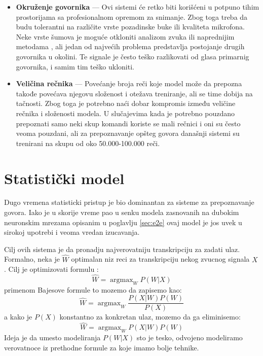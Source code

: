 \documentclass[a4paper]{article}
\DeclareMathOperator*{\argmax}{argmax}
\begin{document}
\begin{itemize}
  \item \textbf{Okruženje govornika} --- 
  Ovi sistemi će retko biti korišćeni u potpuno tihim prostorijama sa profesionalnom opremom za snimanje. Zbog toga treba da budu tolerantni na različite vrste pozadinske buke ili kvaliteta mikrofona. 
  Neke vrste šumova je moguće otkloniti analizom zvuka ili naprednijim metodama \cite{xu2015enhancement}, ali jedan od najvećih problema predstavlja postojanje drugih govornika u okolini.
  Te signale je često teško razlikovati od glasa primarnig govornika, i samim tim teško ukloniti.
  
  \item \textbf{Veličina rečnika} --- 
  Povećanje broja reči koje model može da prepozna takođe povećava njegovu složenost i otežava treniranje, ali se time dobija na tačnosti. 
  Zbog toga je potrebno naći dobar kompromis između veličine rečnika i složenosti modela. 
  U slučajevima kada je potrebno pouzdano prepoznati samo neki skup komandi koriste se mali rečnici i oni su često veoma pouzdani, ali za prepoznavanje opšteg govora današnji sistemi su trenirani na skupu od oko 50.000-100.000 reči.
\end{itemize}

\section{Statistički model}
\label{sec:statistical}

Dugo vremena statisticki pristup je bio dominantan za sisteme za prepoznavanje govora.
Iako je u skorije vreme pao u senku modela zasnovanih na dubokim neuronskim mrezama opisanim u poglavlju \ref{sec:e2e} ovaj model je jos uvek u sirokoj upotrebi i veoma vredan izucavanja.

Cilj ovih sistema je da pronadju najverovatniju transkripciju za zadati ulaz.
Formalno, neka je $\hat{W}$ optimalan niz reci za transkripciju nekog zvucnog signala $X$. Cilj je optimizovati formulu \cite{kamath2019nlp}:
\begin{equation*}
  \hat{W} = \argmax_{W} P(W|X)
\end{equation*}
primenom Bajesove formule to mozemo da zapisemo kao:
\begin{equation*}
  \hat{W} = \argmax_{W} \frac{P(X|W) P(W)}{P(X)}
\end{equation*}
a kako je $P(X)$ konstantno za konkretan ulaz, mozemo da ga eliminisemo:
\begin{equation}
  \label{eq:stat1}
  \hat{W} = \argmax_{W} P(X|W) P(W)
\end{equation}
Ideja je da umesto modeliranja $P(W|X)$ sto je tesko, odvojeno modeliramo verovatnoce iz prethodne formule za koje imamo bolje tehnike.
\end{document}
